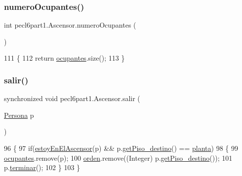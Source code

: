 \subsubsection{\texorpdfstring{numero\+Ocupantes()}{numeroOcupantes()}}
{\footnotesize\ttfamily int pecl6part1.\+Ascensor.\+numero\+Ocupantes (\begin{DoxyParamCaption}{ }\end{DoxyParamCaption})\hspace{0.3cm}{\ttfamily [inline]}}


\begin{DoxyCode}
111     \{
112         \textcolor{keywordflow}{return} \mbox{\hyperlink{classpecl6part1_1_1_ascensor_aabf71a3bf26b3bff458534e518835c71}{ocupantes}}.size();
113     \}
\end{DoxyCode}
\mbox{\label{classpecl6part1_1_1_ascensor_a1a2339117b608f4b270c60e12e0bea57}} 
\subsubsection{\texorpdfstring{salir()}{salir()}}
{\footnotesize\ttfamily synchronized void pecl6part1.\+Ascensor.\+salir (\begin{DoxyParamCaption}\item[{\mbox{\hyperlink{classpecl6part1_1_1_persona}{Persona}}}]{p }\end{DoxyParamCaption})\hspace{0.3cm}{\ttfamily [inline]}}


\begin{DoxyCode}
96     \{
97         \textcolor{keywordflow}{if}(\mbox{\hyperlink{classpecl6part1_1_1_ascensor_af9df13b79ebb74d8db4277d32c7c2bf5}{estoyEnElAscensor}}(p) && p.\mbox{\hyperlink{classpecl6part1_1_1_persona_a82e55b6a597ab6cc0aa1d8fcfed9164b}{getPiso\_destino}}() == 
      \mbox{\hyperlink{classpecl6part1_1_1_ascensor_a580b836287ba07c6658c03a5e35fbbdb}{planta}})
98         \{
99             \mbox{\hyperlink{classpecl6part1_1_1_ascensor_aabf71a3bf26b3bff458534e518835c71}{ocupantes}}.remove(p);
100             \mbox{\hyperlink{classpecl6part1_1_1_ascensor_adbe3c1b625d285b4b5011ef0235f3c9f}{orden}}.remove((Integer) p.\mbox{\hyperlink{classpecl6part1_1_1_persona_a82e55b6a597ab6cc0aa1d8fcfed9164b}{getPiso\_destino}}());
101             p.\mbox{\hyperlink{classpecl6part1_1_1_persona_aa12dc3804209c0efb920b2fda7d1fbbd}{terminar}}();
102         \}
103     \}
\end{DoxyCode}


